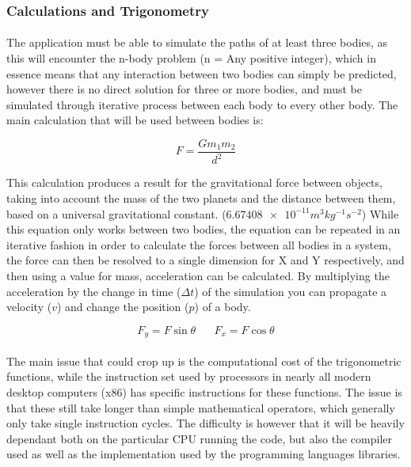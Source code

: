 \subsubsection{Calculations and Trigonometry}

\paragraph{}
The application must be able to simulate the paths of at least three bodies, as this will encounter the n-body problem (n = Any positive integer), which in essence means that any interaction between two bodies can simply be predicted, however there is no direct solution for three or more bodies, and must be simulated through iterative process between each body to every other body.
The main calculation that will be used between bodies is:

$$F=\frac{Gm_1m_2}{d^2}$$

This calculation produces a result for the gravitational force between objects, taking into account the mass of the two planets and the distance between them, based on a universal gravitational constant. ($\num{6.67408e-11} m^{3} kg^{-1} s^{-2}$) 
While this equation only works between two bodies, the equation can be repeated in an iterative fashion in order to calculate the forces between all bodies in a system, the force can then be resolved to a single dimension for X and Y respectively, and then using a value for mass, acceleration can be calculated. By multiplying the acceleration by the change in time ($\Delta t$) of the simulation you can propagate a velocity ($v$) and change the position ($p$) of a body.

$$F_y=F\sin{\theta} \hspace{20pt} F_x=F\cos{\theta}$$

\paragraph{}
The main issue that could crop up is the computational cost of the trigonometric functions, while the instruction set used by processors in nearly all modern desktop computers (x86) has specific instructions for these functions.
The issue is that these still take longer than simple mathematical operators, which generally only take single instruction cycles. The difficulty is however that it will be heavily dependant both on the particular CPU running the code, but also the compiler used as well as the implementation used by the programming languages libraries.

